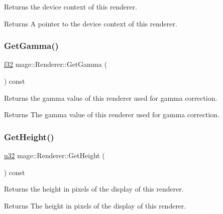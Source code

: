 Returns the device context of this renderer.

\begin{DoxyReturn}{Returns}
A pointer to the device context of this renderer. 
\end{DoxyReturn}
\hypertarget{classmage_1_1_renderer_a12c0665b88d28d329d35535a49dabdac}{}\label{classmage_1_1_renderer_a12c0665b88d28d329d35535a49dabdac} 
\subsubsection{\texorpdfstring{Get\+Gamma()}{GetGamma()}}
{\footnotesize\ttfamily \hyperlink{namespacemage_a6a44ad388483959dc4dff9f2aef91431}{f32} mage\+::\+Renderer\+::\+Get\+Gamma (\begin{DoxyParamCaption}{ }\end{DoxyParamCaption}) const\hspace{0.3cm}{\ttfamily [noexcept]}}

Returns the gamma value of this renderer used for gamma correction.

\begin{DoxyReturn}{Returns}
The gamma value of this renderer used for gamma correction. 
\end{DoxyReturn}
\hypertarget{classmage_1_1_renderer_a19767d9a6853a7ab37d218fa0eb6ed27}{}\label{classmage_1_1_renderer_a19767d9a6853a7ab37d218fa0eb6ed27} 
\subsubsection{\texorpdfstring{Get\+Height()}{GetHeight()}}
{\footnotesize\ttfamily \hyperlink{namespacemage_af2b398bf98eb10351f49cad73fe2cc73}{u32} mage\+::\+Renderer\+::\+Get\+Height (\begin{DoxyParamCaption}{ }\end{DoxyParamCaption}) const\hspace{0.3cm}{\ttfamily [noexcept]}}

Returns the height in pixels of the display of this renderer.

\begin{DoxyReturn}{Returns}
The height in pixels of the display of this renderer. 
\end{DoxyReturn}
\hypertarget{classmage_1_1_renderer_a6f19510d91cb5dd71c41fde26db9aeaa}{}\label{classmage_1_1_renderer_a6f19510d91cb5dd71c41fde26db9aeaa} 
